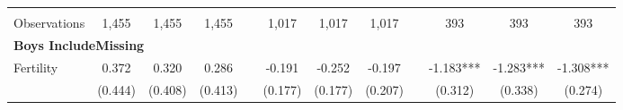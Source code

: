 \begin{landscape}
\begin{table}[htpb!]
\begin{center}
\begin{tabular}{lcccp{2mm}cccp{2mm}ccc}
\begin{footnotesize}\end{footnotesize}&\begin{footnotesize}\end{footnotesize}&\begin{footnotesize}\end{footnotesize}&\begin{footnotesize}\end{footnotesize}&\begin{footnotesize}\end{footnotesize}&\begin{footnotesize}\end{footnotesize}&\begin{footnotesize}\end{footnotesize}&\begin{footnotesize}\end{footnotesize}&\begin{footnotesize}\end{footnotesize}&\begin{footnotesize}\end{footnotesize}&\begin{footnotesize}\end{footnotesize}&\begin{footnotesize}\end{footnotesize}\\Observations&1,455&1,455&1,455&&1,017&1,017&1,017&&393&393&393\\
\multicolumn{12}{l}{\textbf{Boys IncludeMissing}}\\ 
Fertility&0.372&0.320&0.286&&-0.191&-0.252&-0.197&&-1.183***&-1.283***&-1.308***\\
&(0.444)&(0.408)&(0.413)&&(0.177)&(0.177)&(0.207)&&(0.312)&(0.338)&(0.274)\\

\end{tabular}
\end{center}
\end{table}
\end{landscape}
